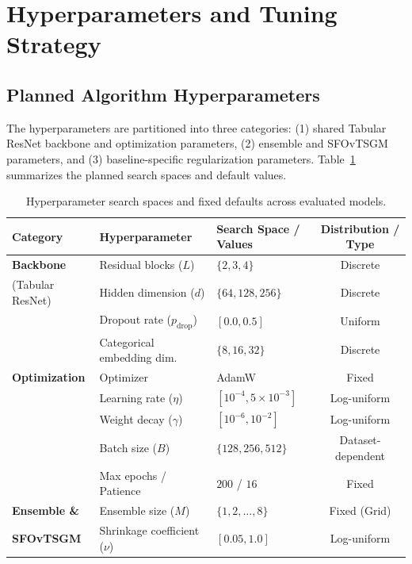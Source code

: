 \documentclass[11pt, a4paper]{article}
\begin{document}
\section{Hyperparameters and Tuning Strategy}

\subsection{Planned Algorithm Hyperparameters}
The hyperparameters are partitioned into three categories: (1) shared Tabular ResNet backbone and optimization parameters, (2) ensemble and SFOvTSGM parameters, and (3) baseline-specific regularization parameters. Table~\ref{tab:hyperparameters} summarizes the planned search spaces and default values.

\begin{table}[htbp]
    \centering
    \caption{Hyperparameter search spaces and fixed defaults across evaluated models.}
    \label{tab:hyperparameters}
    \vspace{0.2cm}
    \begin{tabular}{lllc}
        \toprule
        \textbf{Category} & \textbf{Hyperparameter} & \textbf{Search Space / Values} & \textbf{Distribution / Type} \\
        \midrule
        \textbf{Backbone} 
        & Residual blocks ($L$) & $\{2, 3, 4\}$ & Discrete \\
        (Tabular ResNet) & Hidden dimension ($d$) & $\{64, 128, 256\}$ & Discrete \\
        & Dropout rate ($p_{\text{drop}}$) & $[0.0, 0.5]$ & Uniform \\
        & Categorical embedding dim.\ & $\{8, 16, 32\}$ & Discrete \\
        \midrule
        \textbf{Optimization} 
        & Optimizer & AdamW & Fixed \\
        & Learning rate ($\eta$) & $[10^{-4}, 5 \times 10^{-3}]$ & Log-uniform \\
        & Weight decay ($\gamma$) & $[10^{-6}, 10^{-2}]$ & Log-uniform \\
        & Batch size ($B$) & $\{128, 256, 512\}$ & Dataset-dependent \\
        & Max epochs / Patience & $200$ / $16$ & Fixed \\
        \midrule
        \textbf{Ensemble \&} 
        & Ensemble size ($M$) & $\{1,2, \dots, 8\}$ & Fixed (Grid) \\
        \textbf{SFOvTSGM} & Shrinkage coefficient ($\nu$) & $[0.05, 1.0]$ & Log-uniform \\

\end{tabular}
\end{table}
\end{document}
